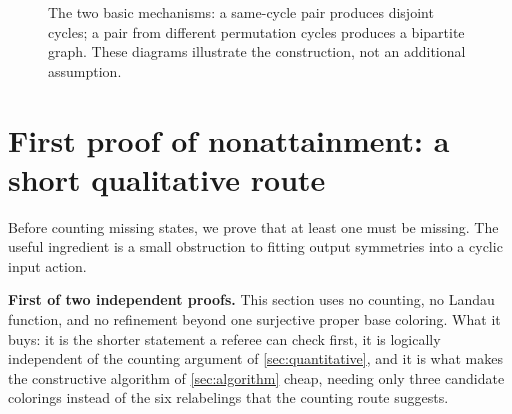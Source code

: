 \documentclass[11pt,a4paper]{article}
\numberwithin{equation}{section}
\theoremstyle{definition}
\theoremstyle{remark}
\begin{document}
\begin{figure}[ht]
\centering
{}
\caption{The two basic mechanisms: a same-cycle pair produces disjoint
cycles; a pair from different permutation cycles produces a bipartite graph.
These diagrams illustrate the construction, not an additional assumption.}
\label{fig:graphs}
\end{figure}

\section{First proof of nonattainment: a short qualitative
route}\label{sec:qualitative}

Before counting missing states, we prove that at least one must be missing.
The useful ingredient is a small obstruction to fitting output symmetries
into a cyclic input action.

\begin{resultbox}
\textbf{First of two independent proofs.} This section uses no counting, no
Landau function, and no refinement beyond one surjective proper base
coloring. What it buys: it is the shorter statement a referee can check
first, it is logically independent of the counting argument of
\cref{sec:quantitative}, and it is what makes the constructive algorithm of
\cref{sec:algorithm} cheap, needing only three candidate colorings instead of
the six relabelings that the counting route suggests.
\end{resultbox}
\end{document}
